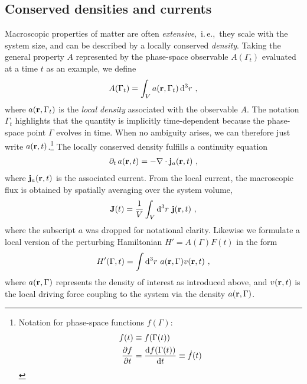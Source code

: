 \subsection{Conserved densities and currents}
Macroscopic properties of matter are often \emph{extensive},~i.\,e.,~they scale with the system size, and can be described by a locally conserved \emph{density}. Taking the general property $A$ represented by the phase-space observable $A(\Gamma_t)$ evaluated at a time $t$ as an example, we define
\begin{align}
  A (\Gamma_t) = \int_V a (\b r, \Gamma_t) \, \d^3 r~,
  \label{eq:lr.A}
\end{align}
where $a({\bf r}, \Gamma_t)$ is the \emph{local density} associated with the observable $A$. The notation $\Gamma_t$ highlights that the quantity is implicitly time-dependent because the phase-space point $\Gamma$ evolves in time.
When no ambiguity arises, we can therefore just write $a ({\bf r}, t)$.\footnote{
	Notation for phase-space functions $f (\Gamma)$:
	\begin{align*}
	f(t) &\equiv f(\Gamma (t)) \\
	\frac{\partial f}{\partial t} &= \frac{{\rm d} f (\Gamma (t))}{{\rm d} t} \equiv \dot{f}(t)
	\end{align*}
}
The locally conserved density fulfills a continuity equation
\begin{align}
  \partial_t \, a(\b r, t) = - \b \nabla \cdot \b j_a (\b r, t)~,
  \label{eq:lr.continuity.1}
\end{align}
where ${\bf j}_a ({\bf r}, t)$ is the associated current. From the local current, the macroscopic flux is obtained by spatially averaging over the system volume,
\begin{align}
  \b J (t)
    = \frac{1}{V} \int_V \d^3 r ~ \b j (\b r, t)~,
  \label{eq:lr.J(t)}
\end{align}
where the subscript $a$ was dropped for notational clarity.
Likewise we formulate a local version of the perturbing Hamiltonian \mbox{$H' = A (\Gamma) F(t)$} in the form
\begin{align}
	H' (\Gamma, t) = \int \d^3 r ~ a (\b r, \Gamma) v(\b r, t)~,
	\label{eq:lr.H'}
\end{align}
where $a({\bf r}, \Gamma)$ represents the density of interest as introduced above, and $v({\bf r}, t)$ is the local driving force coupling to the system via the density $a ({\bf r}, \Gamma)$.

